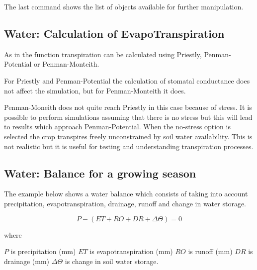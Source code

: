 \documentclass[12pt]{article}\usepackage[]{graphicx}\usepackage[]{color}
\begin{document}
The last command  shows the list of objects available
for further manipulation. 

\subsection{Water: Calculation of EvapoTranspiration}

As in the  function transpiration can be calculated using
Priestly, Penman-Potential or Penman-Monteith.



For Priestly and Penman-Potential the calculation of stomatal conductance does
not affect the simulation, but for Penman-Monteith it does.



Penman-Moneith does not quite reach Priestly in this case because of
stress. It is possible to perform simulations assuming that there is
no stress but this will lead to results which approach
Penman-Potential. When the no-stress option is selected the crop
transpires freely unconstrained by soil water availability. This is
not realistic but it is useful for testing and understanding
transpiration processes.



\subsection{Water: Balance for a growing season}

The example below shows a water balance which consists of taking into
account precipitation, evapotranspiration, drainage, runoff and change
in water storage.

\[ P - (ET + RO + DR + \Delta \Theta) = 0 \]

where 

$P$ is precipitation (mm)
$ET$ is evapotranspiration (mm)
$RO$ is runoff (mm)
$DR$ is drainage (mm)
$\Delta \Theta$ is change in soil water storage.
\end{document}
